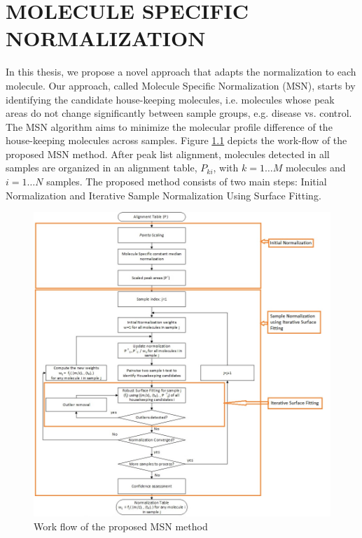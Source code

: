 \chapter{MOLECULE SPECIFIC NORMALIZATION}

In this thesis, we propose a novel approach that adapts the normalization to each molecule. Our approach, called Molecule Specific Normalization (MSN), starts by identifying the candidate house-keeping molecules, i.e. molecules whose peak areas do not change significantly between sample groups, e.g. disease vs. control. The MSN algorithm aims to minimize the molecular profile difference of the house-keeping molecules across samples. Figure \ref{wf} depicts the work-flow of the proposed MSN method. After peak list alignment, molecules detected in all samples are organized in an alignment table, $P_{ki}$, with $k=1 \dots M$ molecules and $i=1 \dots N$ samples. The proposed method consists of two main steps: Initial Normalization and Iterative Sample Normalization Using Surface Fitting. 
\begin{figure}
	
	\centering
	\includegraphics[width=1.1\textwidth]{Work_Flow3}
	\caption{Work flow of the proposed MSN method}
	\label{wf}
\end{figure}

